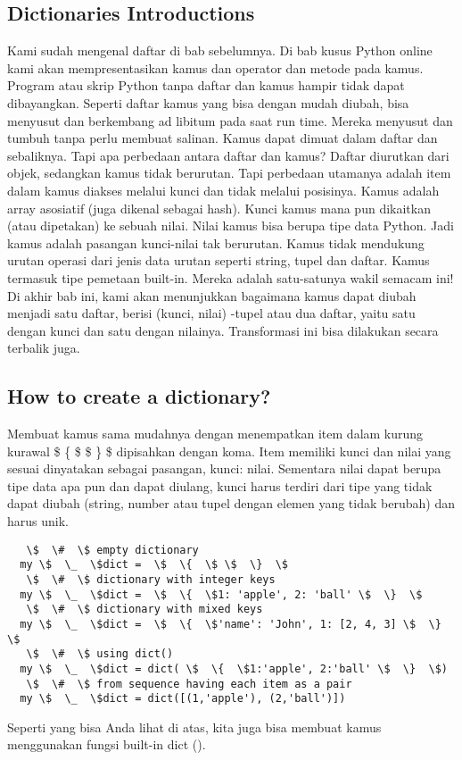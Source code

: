 \subsection{Dictionaries Introductions} 
Kami sudah mengenal daftar di bab sebelumnya. Di bab kusus Python online kami akan mempresentasikan kamus dan operator dan metode pada kamus. Program atau skrip Python tanpa daftar dan kamus hampir tidak dapat dibayangkan. Seperti daftar kamus yang bisa dengan mudah diubah, bisa menyusut dan berkembang ad libitum pada saat run time. Mereka menyusut dan tumbuh tanpa perlu membuat salinan. Kamus dapat dimuat dalam daftar dan sebaliknya. Tapi apa perbedaan antara daftar dan kamus? Daftar diurutkan dari objek, sedangkan kamus tidak berurutan. Tapi perbedaan utamanya adalah item dalam kamus diakses melalui kunci dan tidak melalui posisinya. Kamus adalah array asosiatif (juga dikenal sebagai hash). Kunci kamus mana pun dikaitkan (atau dipetakan) ke sebuah nilai. Nilai kamus bisa berupa tipe data Python. Jadi kamus adalah pasangan kunci-nilai tak berurutan. 
Kamus tidak mendukung urutan operasi dari jenis data urutan seperti string, tupel dan daftar. Kamus termasuk tipe pemetaan built-in. Mereka adalah satu-satunya wakil semacam ini! 
Di akhir bab ini, kami akan menunjukkan bagaimana kamus dapat diubah menjadi satu daftar, berisi (kunci, nilai) -tupel atau dua daftar, yaitu satu dengan kunci dan satu dengan nilainya. Transformasi ini bisa dilakukan secara terbalik juga. 

\subsection{How to create a dictionary?}
Membuat kamus sama mudahnya dengan menempatkan item dalam kurung kurawal  \$  \{  \$ \$  \}  \$ dipisahkan dengan koma. Item memiliki kunci dan nilai yang sesuai dinyatakan sebagai pasangan, kunci: nilai. Sementara nilai dapat berupa tipe data apa pun dan dapat diulang, kunci harus terdiri dari tipe yang tidak dapat diubah (string, number atau tupel dengan elemen yang tidak berubah) dan harus unik. 
\begin{verbatim}
   \$  \#  \$ empty dictionary 
  my \$  \_  \$dict =  \$  \{  \$ \$  \}  \$ 
   \$  \#  \$ dictionary with integer keys 
  my \$  \_  \$dict =  \$  \{  \$1: 'apple', 2: 'ball' \$  \}  \$ 
   \$  \#  \$ dictionary with mixed keys 
  my \$  \_  \$dict =  \$  \{  \$'name': 'John', 1: [2, 4, 3] \$  \}  \$ 
   \$  \#  \$ using dict() 
  my \$  \_  \$dict = dict( \$  \{  \$1:'apple', 2:'ball' \$  \}  \$) 
   \$  \#  \$ from sequence having each item as a pair 
  my \$  \_  \$dict = dict([(1,'apple'), (2,'ball')])
\end{verbatim}
Seperti yang bisa Anda lihat di atas, kita juga bisa membuat kamus menggunakan fungsi built-in dict (). 

